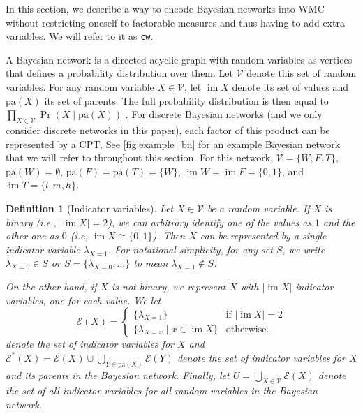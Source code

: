 \documentclass{article}
\newtheorem{definition}{Definition}
\DeclareMathOperator{\im}{im}
\begin{document}
In this section, we describe a way to encode Bayesian networks into WMC without
restricting oneself to factorable measures and thus having to add extra
variables. We will refer to it as \texttt{cw}.

A Bayesian network is a directed acyclic graph with random variables as vertices
that defines a probability distribution over them. Let $\mathcal{V}$ denote this
set of random variables. For any random variable $X \in \mathcal{V}$, let $\im
X$ denote its set of values and $\mathrm{pa}(X)$ its set of parents. The
full probability distribution is then equal to $\prod_{X \in \mathcal{V}} \Pr(X
\mid \mathrm{pa}(X))$ \cite{DBLP:books/daglib/0023820}. For discrete Bayesian
networks (and we only consider discrete networks in this paper), each factor of
this product can be represented by a CPT. See \cref{fig:example_bn} for an
example Bayesian network that we will refer to throughout this section. For
this network, $\mathcal{V} = \{ W, F, T \}$, $\mathrm{pa}(W) = \emptyset$,
$\mathrm{pa}(F) = \mathrm{pa}(T) = \{ W \}$, $\im W = \im F = \{0, 1 \}$, and
$\im T = \{ l, m, h \}$.

\begin{definition}[Indicator variables]
  Let $X \in \mathcal{V}$ be a random variable. If $X$ is binary (i.e., $|\im X|
  = 2$), we can arbitrary identify one of the values as $1$ and the other one as
  $0$ (i.e, $\im X \cong \{ 0, 1 \}$). Then $X$ can be represented by a single
  \emph{indicator variable} $\lambda_{X=1}$. For notational simplicity, for any
  set $S$, we write $\lambda_{X=0} \in S$ or $S = \{ \lambda_{X=0}, \dots \}$ to
  mean $\lambda_{X=1} \not\in S$.

  On the other hand, if $X$ is not binary, we represent $X$ with $|\im X|$
  indicator variables, one for each value. We let
  \[
    \mathcal{E}(X) = \begin{cases}
      \{ \lambda_{X=1} \} & \text{if } |\im X| = 2 \\
      \{ \lambda_{X=x} \mid x \in \im X \} & \text{otherwise.}
    \end{cases}
  \]
  denote the set of indicator variables for $X$ and $\mathcal{E}^*(X) =
  \mathcal{E}(X) \cup \bigcup_{Y \in \mathrm{pa}(X)} \mathcal{E}(Y)$ denote the
  set of indicator variables for $X$ and its parents in the Bayesian network.
  Finally, let $U = \bigcup_{X \in \mathcal{V}} \mathcal{E}(X)$ denote the set
  of all indicator variables for all random variables in the Bayesian network.
\end{definition}
\end{document}
